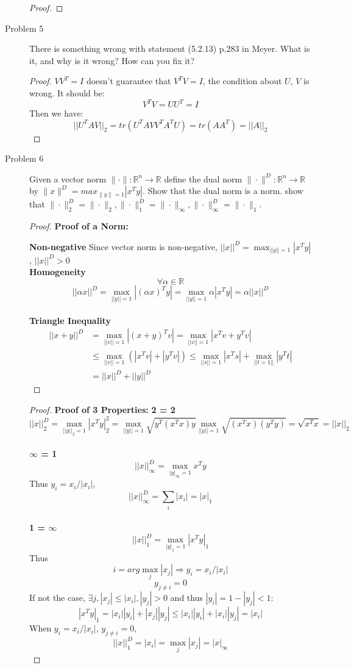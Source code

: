 \documentclass{article}
\begin{document}
\begin{description}
\begin{proof}
	\end{proof}

	\item[Problem 5] There is something wrong with statement (5.2.13) p.283 in Meyer. What is it, and why is it wrong? How can you fix it?
	\begin{proof}
		$VV^T = I$ doesn't guarantee that $V^TV = I$, the condition about $U$, $V$ is wrong. It should be:
		$$ V^TV = UU^T = I$$
		Then we have:\\
		$$ ||U^TAV||_2 = tr(U^TAVV^TA^TU) = tr(AA^T) = ||A||_2$$
	\end{proof}

	\item[Problem 6] Given a vector norm $\|\cdot\|:\mathbb{R}^{n}\to\mathbb{R}$ define the dual norm $\|\cdot\|^D:\mathbb{R}^{n}\to\mathbb{R}$ by $\|x\|^D = max_{\|y\|=1}|x^Ty|$. Show that the dual norm is a norm. show that $\|\cdot\|_2^D=\|\cdot\|_2,\|\cdot\|_1^D=\|\cdot\|_\infty,\|\cdot\|_\infty^D=\|\cdot\|_1$.
	\begin{proof}\textbf{Proof of a Norm:}
	
	\textbf{Non-negative}
		Since vector norm is non-negative, $||x||^D = \max_{||y||=1}|x^Ty|$, $||x||^D > 0$
	\\ \textbf{Homogeneity}
		$$\forall \alpha \in \mathbb{R}$$
		$$||\alpha x||^D = \max_{||y||=1}|(\alpha x)^Ty| = \max_{||y||=1}\alpha|x^Ty| = \alpha||x||^D$$
	\\ \textbf{Triangle Inequality}
		\begin{equation}\begin{aligned}
			||x+y||^D 
			& = \max_{||v||=1}|(x+y)^Tv|  
			  = \max_{||v||=1}|x^Tv + y^Tv|  \\
			& \leq \max_{||v||=1}(|x^Tv| + |y^Tv|) 
			  \leq \max_{||s||=1}|x^Ts| + \max_{||t = 1||}|y^Tt| \\
			& = ||x||^D + ||y||^D
		\end{aligned}\end{equation}
	\end{proof}
	\begin{proof}\textbf{Proof of 3 Properties:}
	\textbf{2 = 2} \\ 
		$$||x||^D_2 = \max_{||y||_2=1}|x^Ty|^2_2 = \max_{||y||=1} \sqrt{y^T(x^Tx)y} \max_{||y||=1} \sqrt{(x^Tx)(y^Ty)} = \sqrt{x^Tx} = ||x||_2$$
	\\ \textbf{$\infty$ = 1}
		$$ ||x||^D_\infty = \max_{|y|_\infty = 1} x^Ty $$
		Thus $y_i = x_i / |x_i|$, 
		$$||x||^D_\infty = \sum_i |x_i| = |x|_1$$
	\\ \textbf{1 = $\infty$}
		$$ ||x||^D_1 = \max_{|y|_1 = 1} |x^Ty|_1
		$$
		Thus $$i = arg \max_{j}{|x_j|} \Rightarrow y_i = x_i/|x_i|$$ $$y_{j\neq i} = 0$$
		If not the case, $\exists j, |x_j| \leq |x_i|, |y_j| > 0$ and thus $|y_i| = 1 - |y_j| < 1$:
		$$|x^Ty|_1 = |x_i||y_i| + |x_j||y_j| \leq |x_i||y_i| + |x_i||y_j| = |x_i|$$
		When $y_i = x_i/|x_i|$, $y_{j \neq i} = 0$, 
		$$ ||x||^D_1 = |x_i| = \max_{j}{|x_j|} = |x|_\infty$$
	\end{proof}
\end{description}
\end{document}
